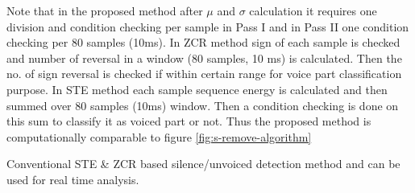 \documentclass[12pt, a4paper, twoside]{report}
\begin{document}
Note that in the proposed method after $\mu$ and $\sigma$ calculation it requires one division and condition checking per sample in Pass I and in Pass II one condition checking per 80 samples (10ms). In ZCR method sign of each sample is checked and number of reversal in a window (80 samples, 10 ms) is calculated. Then the no. of sign reversal is checked if within certain range for voice part classification purpose. In STE method each sample sequence energy is calculated and then summed over 80 samples (10ms) window. Then a condition checking is done on this sum to classify it as voiced part or not. Thus the proposed method is computationally comparable to figure \ref{fig:s-remove-algorithm}

Conventional STE \& ZCR based silence/unvoiced detection method and can be used for real time analysis.
\end{document}
